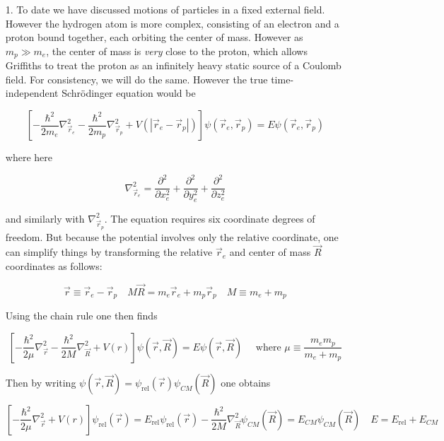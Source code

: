 \begin{itemize}
  \item[1.] To date we have discussed motions of particles in a fixed external
    field. However the hydrogen atom is more complex, consisting of an electron
    and a proton bound together, each orbiting the center of mass. However as
    $m_p \gg m_e$, the  center of mass is \textit{very} close to the proton,
    which allows Griffiths to treat the proton as an infinitely heavy static
    source of a Coulomb field. For consistency, we will do the same. However
    the true time-independent Schr\"odinger equation would be 

    \[
      \left[ -\frac{\hbar^2}{2m_e} \nabla_{\vec{r}_e}^2
        - \frac{\hbar^2}{2m_p}\nabla_{\vec{r}_p}^2 + V(|\vec{r}_e - \vec{r}_p
      |)\right] \psi(\vec{r}_e, \vec{r}_p) = E\psi(\vec{r}_e, \vec{r}_p)
    \] \vspace{3px}
    
    where here 

    \[
      \nabla_{\vec{r}_e}^2 = \frac{\partial^2 }{\partial x_e^2}
      + \frac{\partial^2 }{\partial y_e^2} + \frac{\partial^2 }{\partial z_e^2} 
    \] \vspace{3px}
    
    and similarly with $\nabla_{\vec{r}_p}^2$. The equation requires six
    coordinate degrees of freedom. But because the potential involves only the
    relative coordinate, one can simplify things by transforming the relative
    $\vec{r}_e $ and center of mass $\vec{R}$ coordinates as follows: 


    \[
    \vec{r} \equiv \vec{r}_e - \vec{r}_p \quad M\vec{R} = m_e \vec{r}_e + m_p
    \vec{r}_p \quad M \equiv m_e + m_p
    \] \vspace{3px}
    
    Using the chain rule one then finds 

    \[
    \left[ -\frac{\hbar^2}{2\mu} \nabla_{\vec{r}}^2 - \frac{\hbar^2}{2M}
    \nabla_{\vec{R}}^2 + V(r) \right] \psi(\vec{r}, \vec{R})
    = E\psi(\vec{r},\vec{R}) \quad \text{ where } \mu \equiv \frac{m_e m_p}{m_e
    + m_p}
    \] \vspace{3px}
    
    
    Then by writing $\psi(\vec{r}, \vec{R}) = \psi_\text{rel} (\vec{r})
    \psi_{CM} (\vec{R})$ one obtains 

    \[
      \left[ -\frac{\hbar^2}{2\mu} \nabla_{\vec{r}}^2 + V(r) \right]
      \psi_\text{rel} (\vec{r}) = E_\text{rel} \psi_\text{rel} (\vec{r})
      - \frac{\hbar^2}{2M} \nabla_{\vec{R}}^2 \psi_{CM} (\vec{R}) = E_{CM}
      \psi_{CM} (\vec{R}) \quad E = E_\text{rel} + E_{CM}    
    \] \vspace{3px}
    

\end{itemize}
